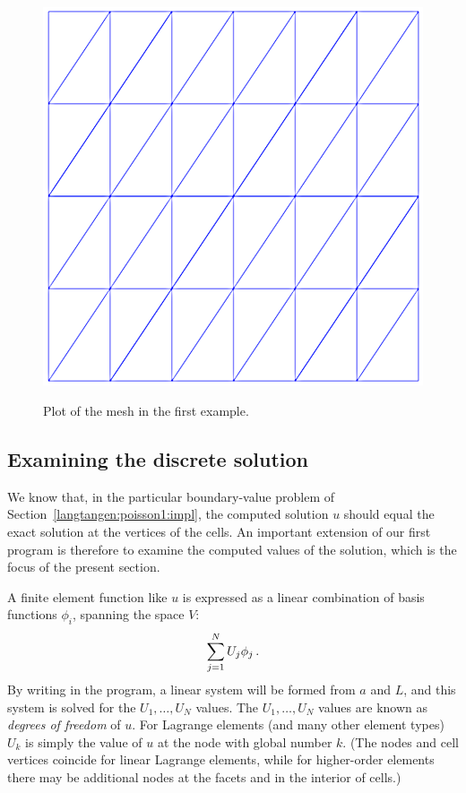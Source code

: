 \begin{figure}
  \begin{center}
    \label{tut:poisson:2D:fig:ex1:mesh}
    \includegraphics[width=\smallfig]{chapters/langtangen/png/ex1_mesh.png}
    \caption{Plot of the mesh in the first \fenics{} example.}
  \end{center}
\end{figure}


\subsection{Examining the discrete solution}
\label{langtangen:poisson1:verify1}

We know that, in the particular boundary-value problem of Section~\ref{langtangen:poisson1:impl}, the computed solution $u$ should equal the exact
solution at the vertices of the cells.
An important extension of our first program is therefore to
examine the computed values of the solution, which is the focus of the
present section.

A finite element function like $u$ is expressed as a linear combination
of basis functions $\phi_i$, spanning the space $V$:
\begin{equation}
\sum_{j=1}^N U_j \phi_j\label{langtangen:poisson1:ufem}\thinspace .
\end{equation}
By writing  in the program, a linear system
will be formed from $a$ and $L$, and this system is solved for the
$U_1,\ldots,U_N$ values. The $U_1,\ldots,U_N$ values are known
as \emph{degrees of freedom} of $u$. For Lagrange elements (and many other
element types) $U_k$ is simply the value of $u$ at the node
with global number $k$.
(The nodes and cell vertices coincide for linear Lagrange elements, while
for higher-order elements there may be additional nodes at
the facets and in the interior of cells.)

